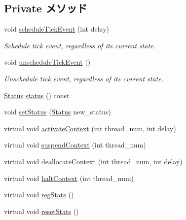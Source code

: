 \subsection*{Private メソッド}
\begin{DoxyCompactItemize}
\item 
void \hyperlink{classOzoneCPU_a5bc22ffa39321290ee497bef49ba9523}{scheduleTickEvent} (int delay)
\begin{DoxyCompactList}\small\item\em Schedule tick event, regardless of its current state. \item\end{DoxyCompactList}\item 
void \hyperlink{classOzoneCPU_ad819e7898bd94721d107a35fde764390}{unscheduleTickEvent} ()
\begin{DoxyCompactList}\small\item\em Unschedule tick event, regardless of its current state. \item\end{DoxyCompactList}\item 
\hyperlink{classOzoneCPU_a67a0db04d321a74b7e7fcfd3f1a3f70b}{Status} \hyperlink{classOzoneCPU_a2ad9e92a82d6f783b3061584729c2f4a}{status} () const 
\item 
void \hyperlink{classOzoneCPU_acdf331c877974ed8697216475a21998d}{setStatus} (\hyperlink{classOzoneCPU_a67a0db04d321a74b7e7fcfd3f1a3f70b}{Status} new\_\-status)
\item 
virtual void \hyperlink{classOzoneCPU_a1fc25b2b1267600be79d406c2da0f465}{activateContext} (int thread\_\-num, int delay)
\item 
virtual void \hyperlink{classOzoneCPU_ad5581eb9bb3abf5f320e3a7d43485601}{suspendContext} (int thread\_\-num)
\item 
virtual void \hyperlink{classOzoneCPU_a24e82fbf299a24c7cb6e2dd33f14e94d}{deallocateContext} (int thread\_\-num, int delay)
\item 
virtual void \hyperlink{classOzoneCPU_a2b63d5ec5d5563f38d63ab0ac6f937f3}{haltContext} (int thread\_\-num)
\item 
virtual void \hyperlink{classOzoneCPU_a4dc637449366fcdfc4e764cdf12d9b11}{regStats} ()
\item 
virtual void \hyperlink{classOzoneCPU_a65880e61108132689a1bd769b9187fb7}{resetStats} ()
\end{DoxyCompactItemize}
